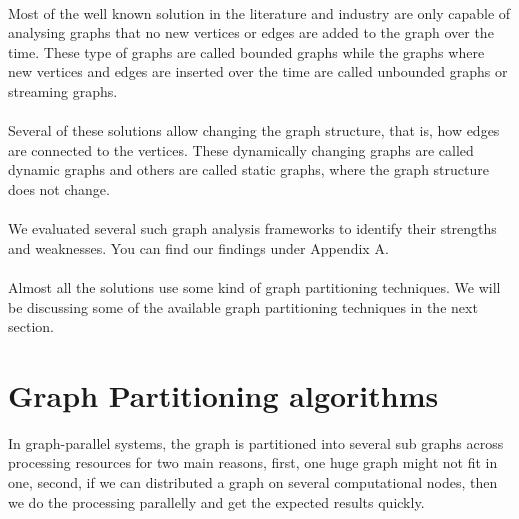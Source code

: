 \documentclass[12pt]{report}
\numberwithin{figure}{section}
\numberwithin{table}{section}
\begin{document}
\paragraph{}

Most of the well known solution in the literature and industry are only capable of analysing graphs that no new vertices or edges are added to the graph over the time. These type of graphs are called bounded graphs while the graphs where new vertices and edges are inserted  over the time are called unbounded graphs or streaming graphs. 

\paragraph{}

Several of these solutions allow changing the graph structure, that is, how edges are connected to the vertices. These dynamically changing graphs are called dynamic graphs and others are called static graphs, where the graph structure does not change.

\paragraph{}

We evaluated several such graph analysis frameworks to identify their strengths and weaknesses. You can find our findings under Appendix A.

\paragraph{}

Almost all the solutions use some kind of graph partitioning techniques. We will be discussing some of the available graph partitioning techniques in the next section.  

\section{Graph Partitioning algorithms}
In graph-parallel systems, the graph is partitioned into several sub graphs across processing resources for two main reasons, first, one huge graph might not fit in one, second, if we can distributed a graph on several computational nodes, then we do the processing parallelly and get the expected results quickly.  

\paragraph{}
\end{document}
